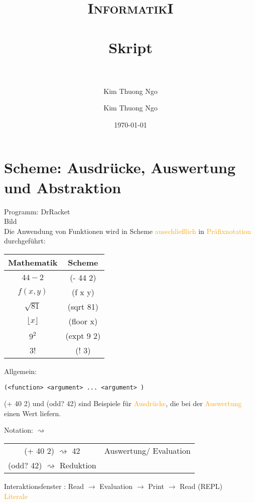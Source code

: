 \documentclass[paper=a4, fontsize=11pt]{scrartcl}
\author{Kim Thuong Ngo}
\title{	
\normalfont \normalsize 
\textsc{InformatikI} \\ [25pt] 
\horrule{0.5pt} \\[0.4cm] 
\huge Skript \\ 
\horrule{2pt} \\[0.5cm] 
}
\author{Kim Thuong Ngo}
\date{\normalsize\today}
\numberwithin{equation}{section}
\numberwithin{figure}{section}
\numberwithin{table}{section}
\begin{document}
\maketitle 
\newpage
\tableofcontents
\newpage
\section{Scheme: Ausdrücke, Auswertung und Abstraktion}
Programm: DrRacket \\

Bild \\

Die Anwendung von Funktionen wird in Scheme \textcolor{orange}{ausschließlich} in \textcolor{orange}{Präfixnotation} durchgeführt:
\begin{tabular}{c|c}
Mathematik & Scheme \\\hline
$44-2$ & (- 44 2) \\
$f(x,y)$ & (f x y)\\
$\sqrt{81}$ & (sqrt 81)\\
$\lfloor x \rfloor$ & (floor x)\\
$9^{2}$  & (expt 9 2) \\
3! & (! 3) \\
\end{tabular}

Allgemein:
\begin{lstlisting}
(<function> <argument> ... <argument> )
\end{lstlisting}

(+ 40 2) und (odd? 42) sind Beispiele für \textcolor{orange}{Ausdrücke}, die bei der \textcolor{orange}{Auswertung} einen Wert liefern.

Notation: $\rightsquigarrow$
\begin{tabular}{cc}
(+ 40 2) $\rightsquigarrow$ 42 & Auswertung/ Evaluation \\
(odd? 42) $\rightsquigarrow$ Reduktion \\
\end{tabular}

Interaktionsfenster : Read $\rightarrow$ Evaluation $\rightarrow$ Print $\rightarrow$ Read (REPL) \\

\textcolor{orange}{Literale}


\end{document}
